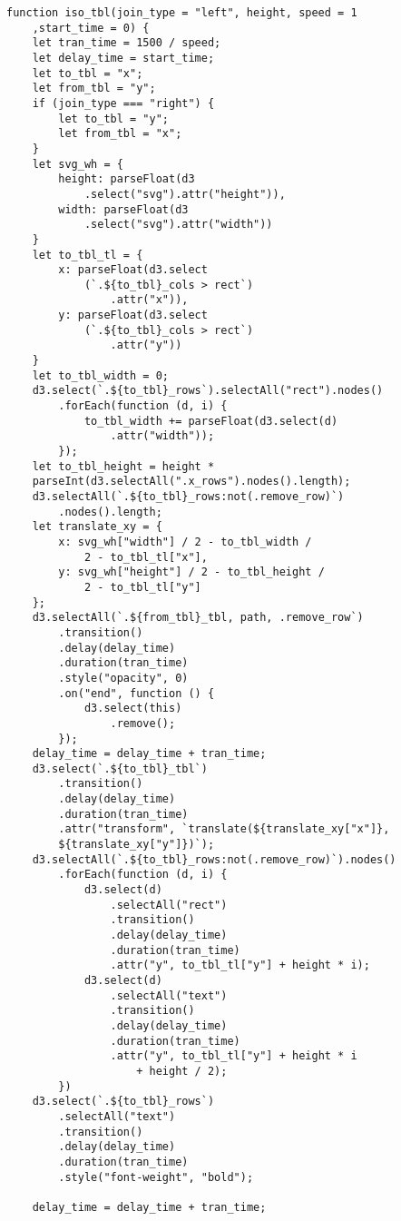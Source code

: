 \begin{lstlisting}
function iso_tbl(join_type = "left", height, speed = 1
    ,start_time = 0) {
    let tran_time = 1500 / speed;
    let delay_time = start_time;
    let to_tbl = "x";
    let from_tbl = "y";
    if (join_type === "right") {
        let to_tbl = "y";
        let from_tbl = "x";
    }
    let svg_wh = {
        height: parseFloat(d3
            .select("svg").attr("height")),
        width: parseFloat(d3
            .select("svg").attr("width"))
    }
    let to_tbl_tl = {
        x: parseFloat(d3.select
            (`.${to_tbl}_cols > rect`)
                .attr("x")),
        y: parseFloat(d3.select
            (`.${to_tbl}_cols > rect`)
                .attr("y"))
    }
    let to_tbl_width = 0;
    d3.select(`.${to_tbl}_rows`).selectAll("rect").nodes()
        .forEach(function (d, i) {
            to_tbl_width += parseFloat(d3.select(d)
                .attr("width"));
        });
    let to_tbl_height = height *
    parseInt(d3.selectAll(".x_rows").nodes().length);
    d3.selectAll(`.${to_tbl}_rows:not(.remove_row)`)
        .nodes().length;
    let translate_xy = {
        x: svg_wh["width"] / 2 - to_tbl_width / 
            2 - to_tbl_tl["x"],
        y: svg_wh["height"] / 2 - to_tbl_height / 
            2 - to_tbl_tl["y"]
    };
    d3.selectAll(`.${from_tbl}_tbl, path, .remove_row`)
        .transition()
        .delay(delay_time)
        .duration(tran_time)
        .style("opacity", 0)
        .on("end", function () {
            d3.select(this)
                .remove();
        });
    delay_time = delay_time + tran_time;
    d3.select(`.${to_tbl}_tbl`)
        .transition()
        .delay(delay_time)
        .duration(tran_time)
        .attr("transform", `translate(${translate_xy["x"]},
        ${translate_xy["y"]})`);
    d3.selectAll(`.${to_tbl}_rows:not(.remove_row)`).nodes()
        .forEach(function (d, i) {
            d3.select(d)
                .selectAll("rect")
                .transition()
                .delay(delay_time)
                .duration(tran_time)
                .attr("y", to_tbl_tl["y"] + height * i);
            d3.select(d)
                .selectAll("text")
                .transition()
                .delay(delay_time)
                .duration(tran_time)
                .attr("y", to_tbl_tl["y"] + height * i 
                    + height / 2);
        })
    d3.select(`.${to_tbl}_rows`)
        .selectAll("text")
        .transition()
        .delay(delay_time)
        .duration(tran_time)
        .style("font-weight", "bold");

    delay_time = delay_time + tran_time;


\end{lstlisting}
